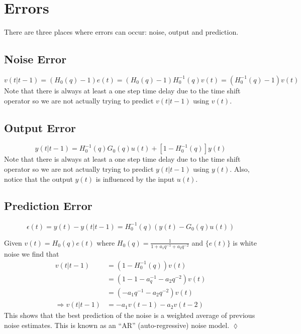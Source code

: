 
\mainmatter
\setcounter{page}{1}

\lectureseries[\course]{\course}

\date{November 3, 2009}

\setaddress

\setcounter{lecture}{11}
\setcounter{chapter}{11}


\section{Errors}
There are three places where errors can occur: noise, output and prediction.

\subsection{Noise Error}
$$v(t|t-1) = (H_0(q)-1)e(t) = (H_0(q)-1)H_0^{-1}(q)v(t) = (H_0^{-1}(q)-1)v(t)$$
Note that there is always at least a one step time delay due to the time shift operator so we are not actually trying to predict $v(t|t-1)$ using $v(t)$.

\subsection{Output Error}
$$y(t|t-1) = H_0^{-1}(q)G_0(q)u(t) + [1-H_0^{-1}(q)]y(t)$$
Note that there is always at least a one step time delay due to the time shift operator so we are not actually trying to predict $y(t|t-1)$ using $y(t)$. Also, notice that the output $y(t)$ is influenced by the input $u(t)$.

\subsection{Prediction Error}
$$\epsilon(t) = y(t) - y(t|t-1) = H_0^{-1}(q)(y(t)-G_0(q)u(t))$$

\begin{example}
Given $v(t) = H_0(q)e(t)$ where $H_0(q) = \frac{1}{1+a_1q^{-1}+a_2q^{-2}}$ and $\{e(t)\}$ is white noise we find that
\begin{align*}
v(t|t-1) &= (1-H_0^{-1}(q))v(t) \\
&= (1-1-a_q^{-1}-a_2q^{-2})v(t) \\
&= (-a_1q^{-1}-a_2q^{-2})v(t) \\
\Rightarrow v(t|t-1) &= -a_1v(t-1)-a_2v(t-2)
\end{align*}
This shows that the best prediction of the noise is a weighted average of previous noise estimates. This is known as an ``AR'' (auto-regressive) noise model.
$\lozenge$
\end{example}


